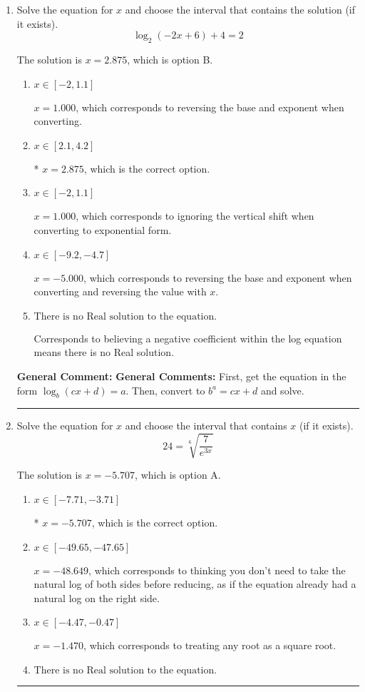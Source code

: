 \documentclass{extbook}[14pt]
\newcommand{\litem}[1]{\item #1

\rule{\textwidth}{0.4pt}}
\begin{document}
\begin{enumerate}\litem{
Solve the equation for $x$ and choose the interval that contains the solution (if it exists).
\[ \log_{2}{(-2x+6)}+4 = 2 \]

The solution is \( x = 2.875 \), which is option B.\begin{enumerate}[label=\Alph*.]
\item \( x \in [-2, 1.1] \)

$x = 1.000$, which corresponds to reversing the base and exponent when converting.
\item \( x \in [2.1, 4.2] \)

* $x = 2.875$, which is the correct option.
\item \( x \in [-2, 1.1] \)

$x = 1.000$, which corresponds to ignoring the vertical shift when converting to exponential form.
\item \( x \in [-9.2, -4.7] \)

$x = -5.000$, which corresponds to reversing the base and exponent when converting and reversing the value with $x$.
\item \( \text{There is no Real solution to the equation.} \)

Corresponds to believing a negative coefficient within the log equation means there is no Real solution.
\end{enumerate}

\textbf{General Comment:} \textbf{General Comments:} First, get the equation in the form $\log_b{(cx+d)} = a$. Then, convert to $b^a = cx+d$ and solve.
}
\litem{
 Solve the equation for $x$ and choose the interval that contains $x$ (if it exists).
\[  24 = \sqrt[6]{\frac{7}{e^{3x}}} \]

The solution is \( x = -5.707 \), which is option A.\begin{enumerate}[label=\Alph*.]
\item \( x \in [-7.71, -3.71] \)

* $x = -5.707$, which is the correct option.
\item \( x \in [-49.65, -47.65] \)

$x = -48.649$, which corresponds to thinking you don't need to take the natural log of both sides before reducing, as if the equation already had a natural log on the right side.
\item \( x \in [-4.47, -0.47] \)

$x = -1.470$, which corresponds to treating any root as a square root.
\item \( \text{There is no Real solution to the equation.} \)


\end{enumerate}}
\end{enumerate}
\end{document}
